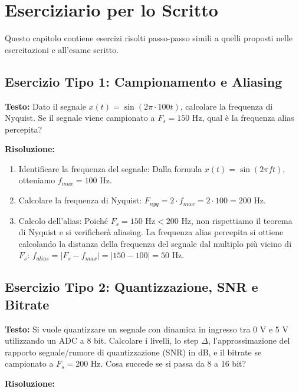 \chapter{Eserciziario per lo Scritto}

Questo capitolo contiene esercizi risolti passo-passo simili a quelli proposti nelle esercitazioni e all'esame scritto.

\section{Esercizio Tipo 1: Campionamento e Aliasing}
\textbf{Testo:} Dato il segnale $x(t) = \sin(2\pi \cdot 100 t)$, calcolare la frequenza di Nyquist.
Se il segnale viene campionato a $F_s = 150 \text{ Hz}$, qual è la frequenza alias percepita?

\vspace{0.5cm}
\textbf{Risoluzione:}

\begin{enumerate}
    \item Identificare la frequenza del segnale: Dalla formula $x(t) = \sin(2\pi f t)$, otteniamo $f_{max} = 100 \text{ Hz}$.
    \item Calcolare la frequenza di Nyquist: $F_{nyq} = 2 \cdot f_{max} = 2 \cdot 100 = 200 \text{ Hz}$.
    \item Calcolo dell'alias: Poiché $F_s = 150 \text{ Hz} < 200 \text{ Hz}$, non rispettiamo il teorema di Nyquist e si verificherà aliasing.
    La frequenza alias percepita si ottiene calcolando la distanza della frequenza del segnale dal multiplo più vicino di $F_s$:
    $f_{alias} = |F_s - f_{max}| = |150 - 100| = 50 \text{ Hz}$.
\end{enumerate}

\section{Esercizio Tipo 2: Quantizzazione, SNR e Bitrate}
\textbf{Testo:} Si vuole quantizzare un segnale con dinamica in ingresso tra 0 V e 5 V utilizzando un ADC a 8 bit.
Calcolare i livelli, lo step $\Delta$, l'approssimazione del rapporto segnale/rumore di quantizzazione (SNR) in dB, e il bitrate se campionato a $F_s = 200 \text{ Hz}$.
Cosa succede se si passa da 8 a 16 bit?

\vspace{0.5cm}
\textbf{Risoluzione:}

